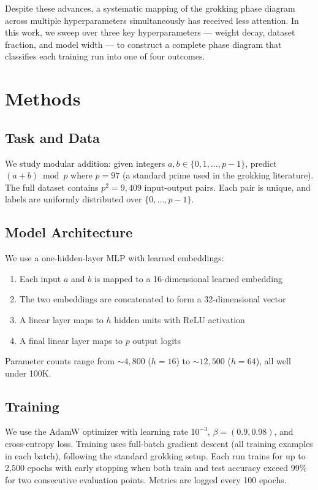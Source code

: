 \documentclass[11pt,a4paper]{article}
\begin{document}
Despite these advances, a systematic mapping of the grokking phase diagram across multiple hyperparameters simultaneously has received less attention. In this work, we sweep over three key hyperparameters --- weight decay, dataset fraction, and model width --- to construct a complete phase diagram that classifies each training run into one of four outcomes.

\section{Methods}

\subsection{Task and Data}

We study modular addition: given integers $a, b \in \{0, 1, \ldots, p-1\}$, predict $(a + b) \bmod p$ where $p = 97$ (a standard prime used in the grokking literature). The full dataset contains $p^2 = 9{,}409$ input-output pairs. Each pair is unique, and labels are uniformly distributed over $\{0, \ldots, p-1\}$.

\subsection{Model Architecture}

We use a one-hidden-layer MLP with learned embeddings:
\begin{enumerate}
  \item Each input $a$ and $b$ is mapped to a 16-dimensional learned embedding
  \item The two embeddings are concatenated to form a 32-dimensional vector
  \item A linear layer maps to $h$ hidden units with ReLU activation
  \item A final linear layer maps to $p$ output logits
\end{enumerate}

Parameter counts range from ${\sim}4{,}800$ ($h = 16$) to ${\sim}12{,}500$ ($h = 64$), all well under 100K.

\subsection{Training}

We use the AdamW optimizer \citep{loshchilov2019adamw} with learning rate $10^{-3}$, $\beta = (0.9, 0.98)$, and cross-entropy loss. Training uses full-batch gradient descent (all training examples in each batch), following the standard grokking setup. Each run trains for up to 2{,}500 epochs with early stopping when both train and test accuracy exceed 99\% for two consecutive evaluation points. Metrics are logged every 100 epochs.
\end{document}
